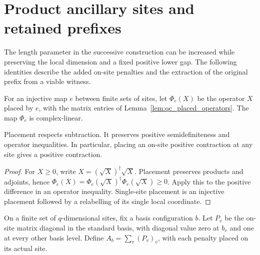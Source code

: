\section{Product ancillary sites and retained prefixes}

The length parameter in the successive construction can be increased while
preserving the local dimension and a fixed positive lower gap. The following
identities describe the added on-site penalties and the extraction of the
original prefix from a viable witness.

\begin{definition}
    \label{def:lvv_placement_linear_map}
    \leanok
    For an injective map $e$ between finite sets of sites, let $\Phi_e(X)$ be the
    operator $X$ placed by $e$, with the matrix entries of
    Lemma~\ref{lem:qc_placed_operators}. The map $\Phi_e$ is complex-linear.
\end{definition}

\begin{lemma}
    \label{thm:lvv_placement_order}
    \leanok
    Placement respects subtraction. It preserves positive
    semidefiniteness and operator inequalities. In particular, placing an
    on-site positive contraction at any site gives a positive contraction.
\end{lemma}
\begin{proof}
    \leanok
    For $X\ge0$, write $X=(\sqrt X)^\dagger\sqrt X$.
    Placement preserves products and adjoints, hence
    $\Phi_e(X)=\Phi_e(\sqrt X)^\dagger\Phi_e(\sqrt X)\ge0$.
    Apply this to the positive difference in an operator inequality.
    Single-site placement is an injective placement followed by a relabelling
    of its single local coordinate.
\end{proof}

\begin{definition}
    \label{def:lvv_product_basis_penalty}
    \leanok
    On a finite set of $q$-dimensional sites, fix a basis configuration $b$.
    Let $P_v$ be the on-site matrix diagonal in the standard basis, with
    diagonal value zero at $b_v$ and one at every other basis level. Define
    $A_b=\sum_v(P_v)_v$, with each penalty placed on its actual site.
\end{definition}

